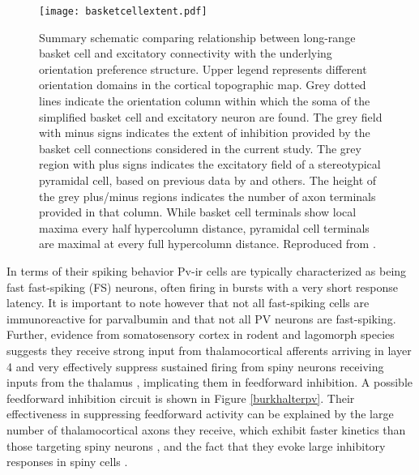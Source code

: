 \begin{figure}
	\centering
        \texttt{[image: basketcellextent.pdf]}
	\caption[Schematic representing the proposed spatial distribution
      of pyramidal and basket cell extents and their relationship to
      the orientation map in V1. Reproduced from
      \cite{Buzas2001}.]{Summary schematic comparing relationship
      between long-range basket cell and excitatory connectivity with
      the underlying orientation preference structure. Upper legend
      represents different orientation domains in the cortical
      topographic map. Grey dotted lines indicate the orientation
      column within which the soma of the simplified basket cell and
      excitatory neuron are found. The grey field with minus signs
      indicates the extent of inhibition provided by the basket cell
      connections considered in the current study. The grey region
      with plus signs indicates the excitatory field of a
      stereotypical pyramidal cell, based on previous data by
      \cite{Bosking1997,Kisvarday1997a} and others. The height of the
      grey plus/minus regions indicates the number of axon terminals
      provided in that column. While basket cell terminals show local
      maxima every half hypercolumn distance, pyramidal cell terminals
      are maximal at every full hypercolumn distance. Reproduced from
      \cite{Buzas2001}.}
	\label{BasketCellExtent}
\end{figure}

In terms of their spiking behavior Pv-ir cells are typically characterized as
being fast fast-spiking (FS) neurons, often firing in bursts with a
very short response latency. It is important to note however that not
all fast-spiking cells are immunoreactive for parvalbumin and that not
all PV neurons are fast-spiking. Further, evidence from somatosensory
cortex in rodent and lagomorph species suggests they receive strong
input from thalamocortical afferents arriving in layer 4 and very
effectively suppress sustained firing from spiny neurons receiving
inputs from the thalamus \citep{Swadlow2003}, implicating them in
feedforward inhibition. A possible feedforward inhibition circuit is
shown in Figure \ref{burkhalterpv}. Their effectiveness in suppressing
feedforward activity can be explained by the large number of
thalamocortical axons they receive, which exhibit faster kinetics than
those targeting spiny neurons \citep{Cruikshank2007,Gabernet2005}, and
the fact that they evoke large inhibitory responses in spiny cells
\citep{Cruikshank2007,Gabernet2005}.

